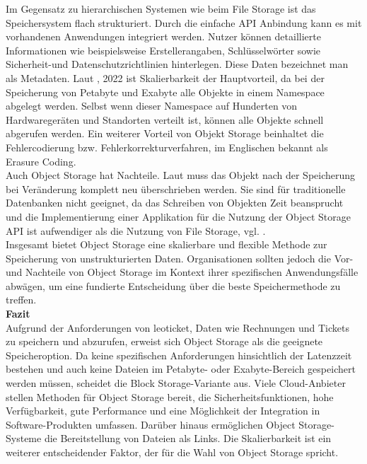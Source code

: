 Im Gegensatz zu hierarchischen Systemen wie beim File Storage ist das Speichersystem flach strukturiert. Durch die einfache API Anbindung kann es mit vorhandenen Anwendungen integriert werden. Nutzer können detaillierte Informationen wie beispielsweise Erstellerangaben, Schlüsselwörter sowie Sicherheit-und Datenschutzrichtlinien hinterlegen. Diese Daten bezeichnet man als Metadaten. Laut \citeauthor{nx-fileScala}, 2022 ist Skalierbarkeit der Hauptvorteil, da bei der Speicherung von Petabyte und Exabyte alle Objekte in einem Namespace abgelegt werden. Selbst wenn dieser Namespace auf Hunderten von Hardwaregeräten und Standorten verteilt ist, können alle Objekte schnell abgerufen werden. Ein weiterer Vorteil von Objekt Storage beinhaltet die Fehlercodierung bzw. Fehlerkorrekturverfahren, im Englischen bekannt als \glqq Erasure Coding\grqq.\\

Auch Object Storage hat Nachteile. Laut \citeauthor{redHat-storage} muss das Objekt nach der Speicherung bei Veränderung komplett neu überschrieben werden. Sie sind für traditionelle Datenbanken nicht geeignet, da das Schreiben von Objekten Zeit beansprucht und die Implementierung einer Applikation für die Nutzung der Object Storage API ist aufwendiger als die Nutzung von File Storage, vgl. \citeauthor{redHat-storage}.\\

Insgesamt bietet Object Storage eine skalierbare und flexible Methode zur Speicherung von unstrukturierten Daten. Organisationen sollten jedoch die Vor- und Nachteile von Object Storage im Kontext ihrer spezifischen Anwendungsfälle abwägen, um eine fundierte Entscheidung über die beste Speichermethode zu treffen.\\


\textbf{Fazit}\\

Aufgrund der Anforderungen von leoticket, Daten wie Rechnungen und Tickets zu speichern und abzurufen, erweist sich Object Storage als die geeignete Speicheroption. Da keine spezifischen Anforderungen hinsichtlich der Latenzzeit bestehen und auch keine Dateien im Petabyte- oder Exabyte-Bereich gespeichert werden müssen, scheidet die Block Storage-Variante aus. Viele Cloud-Anbieter stellen Methoden für Object Storage bereit, die Sicherheitsfunktionen, hohe Verfügbarkeit, gute Performance und eine Möglichkeit der Integration in Software-Produkten umfassen. Darüber hinaus ermöglichen Object Storage-Systeme die Bereitstellung von Dateien als Links. Die Skalierbarkeit ist ein weiterer entscheidender Faktor, der für die Wahl von Object Storage spricht.

